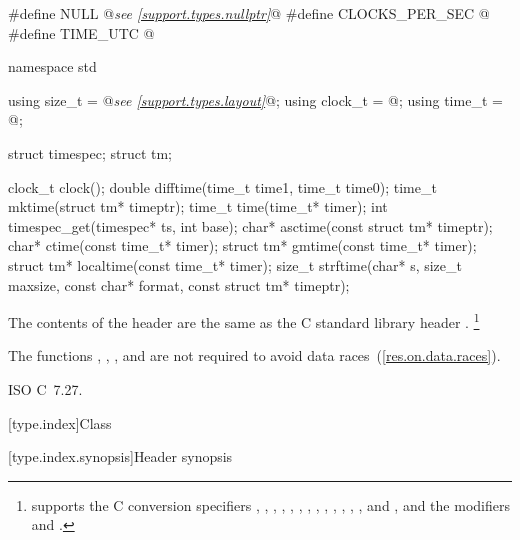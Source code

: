 %
%
%
%
%
%
%
%
%
%
%
%
%
%
%
%
%
%
%
%
\begin{codeblock}
#define NULL @\textit{see \ref{support.types.nullptr}}@
#define CLOCKS_PER_SEC @\seebelow@
#define TIME_UTC @\seebelow@

namespace std {
  using size_t = @\textit{see \ref{support.types.layout}}@;
  using clock_t = @\seebelow@;
  using time_t = @\seebelow@;

  struct timespec;
  struct tm;

  clock_t clock();
  double difftime(time_t time1, time_t time0);
  time_t mktime(struct tm* timeptr);
  time_t time(time_t* timer);
  int timespec_get(timespec* ts, int base);
  char* asctime(const struct tm* timeptr);
  char* ctime(const time_t* timer);
  struct tm* gmtime(const time_t* timer);
  struct tm* localtime(const time_t* timer);
  size_t strftime(char* s, size_t maxsize, const char* format, const struct tm* timeptr);
}
\end{codeblock}

\pnum
{}%
%
%
%
The contents of the header  are the same as the C standard library header .%
\footnote{ supports the C conversion specifiers
, , , , , , ,
, , , , , , and
, and the modifiers  and .}

\pnum
The functions , , , and
 are not required to avoid data
races~(\ref{res.on.data.races}).

\xref ISO C~7.27.

[type.index]{Class }

[type.index.synopsis]{Header  synopsis}

